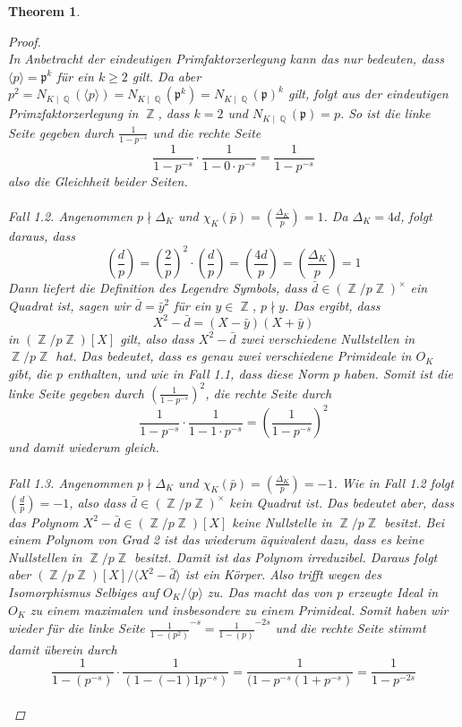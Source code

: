 \documentclass[10pt,a4paper]{article}
\theoremstyle{plain}
\newtheorem{thm}{Theorem}[section]
\theoremstyle{definition}
\theoremstyle{remark}
\DeclareMathOperator{\Q}{\mathbb{Q}}
\DeclareMathOperator{\Z}{\mathbb{Z}}
\begin{document}
\begin{thm}
\begin{proof}
\\
In Anbetracht der eindeutigen Primfaktorzerlegung kann das nur bedeuten, dass $\langle p\rangle =\mathfrak{p}^k$ für ein $k\geq 2$ gilt. Da aber $p^2=N_{K\mid \Q}(\langle p\rangle)=N_{K\mid \Q}(\mathfrak{p}^k) =N_{K\mid \Q}(\mathfrak{p})^k $ gilt, folgt aus der eindeutigen Primzfaktorzerlegung in $\Z$, dass $k = 2$ und $N_{K\mid\Q}(\mathfrak{p}) =p$. So ist die linke Seite gegeben durch $\frac{1}{1-p^{-s}}$ und die rechte Seite $$\frac{1}{1-p^{-s}}\cdot \frac{1}{1-0\cdot p^{-s}}=\frac{1}{1-p^{-s}}$$also die Gleichheit beider Seiten.
\\
\\
\textit{Fall 1.2.}
Angenommen $p \nmid \Delta_K$ und $\chi_K(\bar{p})=(\frac{\Delta_K}{p})= 1$. Da $\Delta_K = 4d$, folgt daraus, dass $$(\frac{d}{p})=(\frac{2}{p})^2\cdot (\frac{d}{p})=(\frac{4d}{p})=(\frac{\Delta_K}{p})=1$$Dann liefert die Definition des Legendre Symbols, dass $\bar{d} \in (\Z/p\Z)^\times$ ein Quadrat ist, sagen wir $\bar{d}=\bar{y}^2$ für ein $y \in \Z$,  $p \nmid y$. Das ergibt, dass $$X^2-\bar{d}=(X-\bar{y})(X+\bar{y})$$ in $(\Z/p\Z)[X] $ gilt, also dass $X^2-\bar{d}$ zwei verschiedene Nullstellen in $\Z/p\Z$ hat. Das bedeutet, dass es genau zwei verschiedene Primideale in $O_K$ gibt, die $p$ enthalten, und wie in Fall 1.1, dass diese Norm $p$ haben. Somit ist die linke Seite gegeben durch $(\frac{1}{1-p^{-s}})^2$, die rechte Seite durch $$\frac{1}{1-p^{-s}}\cdot\frac{1}{1-1\cdot p^{-s}}=(\frac{1}{1-p^{-s}})^2$$ und damit wiederum gleich.
\\
\\
\textit{Fall 1.3.}
Angenommen $p \nmid \Delta_K$ und $\chi_K(\bar{p})=(\frac{\Delta_K}{p})= -1$. Wie in Fall 1.2 folgt $(\frac{d}{p})=-1$, also dass $\bar{d} \in (\Z/p\Z)^\times$ kein Quadrat ist. Das bedeutet aber, dass das Polynom $X^2-\bar{d} \in (\Z/p\Z)[X] $ keine Nullstelle in $\Z/p\Z$ besitzt. Bei einem Polynom von Grad 2 ist das wiederum äquivalent dazu, dass es keine Nullstellen in $\Z/p\Z$ besitzt. Damit ist das Polynom irreduzibel. Daraus folgt aber $(\Z/p\Z)[X]/\langle X^{2}-\bar{d}\rangle$ ist ein Körper. Also trifft wegen des Isomorphismus Selbiges auf $O_K/\langle p\rangle$ zu. Das macht das von $p$ erzeugte Ideal in $O_K$ zu einem maximalen und insbesondere zu einem Primideal. Somit haben wir wieder für die linke Seite $\frac{1}{1-(p^{2})}^{-s}=\frac{1}{1-(p)}^{-2s}$ und die rechte Seite stimmt damit überein durch $$\frac{1}{1-(p^{-s})}\cdot\frac{1}{(1-(-1)1p^{-s})}=\frac{1}{(1-p^{-s}(1+p^{-s})}=\frac{1}{1-p^{-2s}}$$
\\

\end{proof}
\end{thm}
\end{document}
